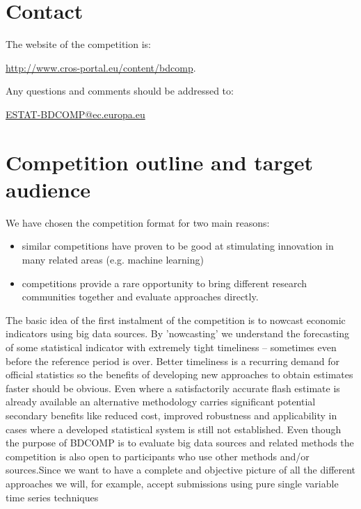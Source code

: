 \documentclass[12pt]{article}
\begin{document}

\newpage
\section{Contact}

The website of the competition is: 

\url{http://www.cros-portal.eu/content/bdcomp}.

Any questions and comments should be addressed to:

\href{mailto:ESTAT-BDCOMP@ec.europa.eu}{ESTAT-BDCOMP@ec.europa.eu}

\newpage
\section{Competition outline and target audience}

We have chosen the competition format for two main reasons:
\begin{itemize}
	\item{ similar competitions have proven to be good at stimulating innovation in many related areas (e.g. machine learning)}
	\item{competitions provide a rare opportunity to bring different research communities together and evaluate approaches directly.}
\end{itemize}

The basic idea of the first instalment of the competition is to nowcast economic indicators using big data sources. By 'nowcasting' we understand the forecasting of some statistical indicator with extremely tight timeliness – sometimes even before the reference period is over. Better timeliness is a recurring demand for official statistics so the benefits of developing new approaches to obtain estimates faster should be obvious. Even where a satisfactorily accurate flash estimate is already available an alternative methodology carries significant potential secondary benefits like reduced cost, improved robustness and applicability in cases where a developed statistical system is still not established.
Even though the purpose of BDCOMP is to evaluate big data sources and related methods the competition is also open to participants who use other methods and/or sources.Since we want to have a complete and objective picture of all the different approaches we will, for example, accept submissions using pure single variable time series techniques 
\end{document}
